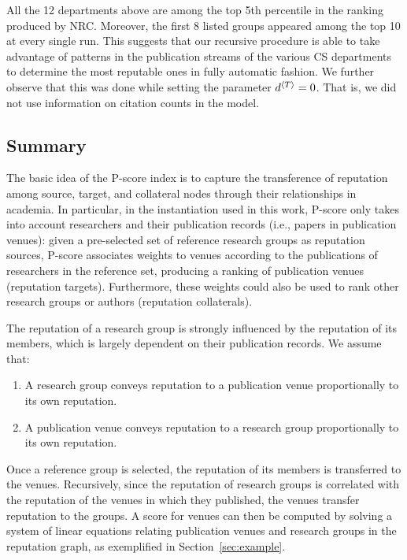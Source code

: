 \documentclass[notitlepage]{svjour3}
\begin{document}
All the 12 departments above are among the top 5th percentile in the ranking produced by NRC. 
Moreover, the first 8 listed groups appeared among the top 10 at every single run.
This suggests that our recursive procedure is able to take advantage of patterns in the publication 
streams of the various CS departments to determine the most reputable ones in fully automatic fashion.
We further observe that this was done while setting the parameter $d{^{\langle T \rangle}} = 0$. That is, we did 
not use information on citation counts in the model. 

\subsection{Summary} 

The basic idea of the P-score index is to capture the transference of reputation among source, 
target, and collateral nodes through their relationships in academia. In particular, in the 
instantiation used in this work, P-score only takes into account researchers and 
their publication records (i.e., papers in publication venues): given a pre-selected 
set of reference research groups as reputation sources, P-score associates weights to
venues according to the publications of researchers in the reference set, producing a ranking of 
publication venues (reputation targets). Furthermore, these weights could also be used to rank other 
research groups or authors (reputation collaterals).

The reputation of a research group is strongly influenced by the reputation of its members, 
which is largely dependent on their publication records. We assume that:
\begin{enumerate}
\item A research group conveys reputation to a publication venue proportionally to its own reputation.
\item A publication venue conveys reputation to a research group proportionally to its own reputation.
\end{enumerate}

Once a reference group is selected, the reputation of its members is transferred to the venues. 
Recursively, since the reputation of research groups is correlated with the reputation of the 
venues in which they published, the venues transfer reputation to the groups. A score for venues 
can then be computed by solving a system of linear equations relating publication venues and 
research groups in the reputation graph, as exemplified in Section~\ref{sec:example}.
\end{document}
